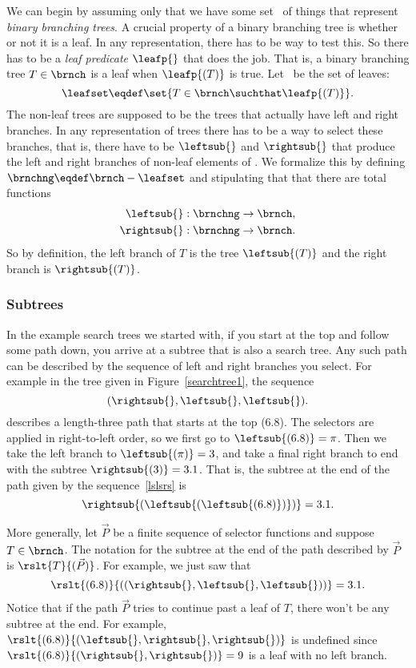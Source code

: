\begin{definition}
We can begin by assuming only that we have some set \brnch\ of things
that represent \emph{binary branching trees}.  A crucial property of a
binary branching tree is whether or not it is a leaf.  In any
representation, there has to be way to test this.  So there has to be
a \emph{leaf predicate} $\leafp{}$ that does the job.  That is, a
binary branching tree $T \in \brnch$ is a leaf when $\leafp{(T)}$ is
true.  Let \leafset\ be the set of leaves:
\[
\leafset \eqdef \set{T \in \brnch \suchthat \leafp{(T)}}.
\]
The non-leaf trees are supposed to be the trees that actually have
left and right branches.  In any representation of trees there has to
be a way to select these branches, that is, there have to be
 $\leftsub{}$ and $\rightsub{}$ that produce
the left and right branches of non-leaf elements of \brnch.  We
formalize this by defining $\brnchng \eqdef \brnch - \leafset$ and
stipulating that that there are total functions
\begin{align*}
\leftsub{}: \brnchng  & \to \brnch,\\
\rightsub{}:\brnchng  & \to \brnch.
\end{align*}
So by definition, the left branch of $T$ is the tree $\leftsub{(T)}$
and the right branch is $\rightsub{(T)}$.

\subsubsection{Subtrees}

In the example search trees we started with, if you start at the top
and follow some path down, you arrive at a subtree that is also a
search tree.  Any such path can be described by the sequence of left
and right branches you select.  For example in the tree given in
Figure~\ref{searchtree1}, the sequence
\begin{equation}\label{lslsrs}
(\rightsub{},\leftsub{},\leftsub{}).
\end{equation}
describes a length-three path that starts at the top (6.8).  The
selectors are applied in right-to-left order, so we first go to
$\leftsub{(6.8)} = \pi$.  Then we take the left branch to
$\leftsub{(\pi)} = 3$, and take a final right branch to end with the
subtree $\rightsub{(3)} = 3.1$.  That is, the subtree at the end of the
path given by the sequence~\eqref{lslsrs} is
\[
\rightsub{(\leftsub{(\leftsub{(6.8)})})} = 3.1.
\]

More generally, let $\vec{P}$ be a finite sequence of selector
functions and suppose $T \in \brnch$.  The notation for the subtree at
the end of the path described by $\vec{P}$ is $\rslt{T}{(\vec{P})}$.
For example, we just saw that
\[
\rslt{(6.8)}{((\rightsub{},\leftsub{},\leftsub{}))} = 3.1.
\]
Notice that if the path $\vec{P}$ tries to continue past a leaf of
$T$, there won't be any subtree at the end.  For example,
$\rslt{(6.8)}{(\leftsub{},\rightsub{},\rightsub{})}$ is undefined
since $\rslt{(6.8)}{(\rightsub{},\rightsub{})}=9$ is a leaf with no
left branch.


\end{definition}
